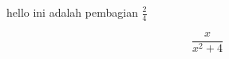 \documentclass[12pt]{article}
\begin{document}
	hello ini adalah pembagian $\frac{2}{4}$
	
	$$\frac{x}{x^2+4}$$
\end{document}

